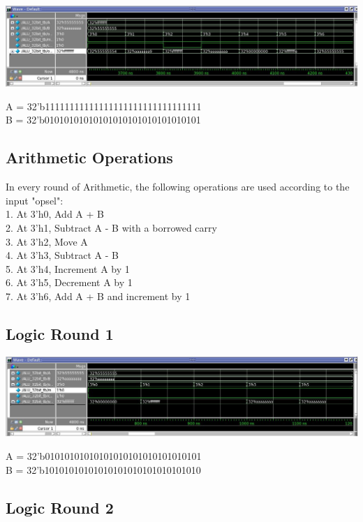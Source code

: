 \documentclass[paper=letter, fontsize=11pt]{scrartcl}
\numberwithin{equation}{section} %
\numberwithin{figure}{section} %
\numberwithin{table}{section} %
\begin{document}
	\centering
			\includegraphics[width=1.0\textwidth]{Art4}
				\label{fig:Art4}
\raggedright A = 32'b11111111111111111111111111111111\\
B = 32'b01010101010101010101010101010101

\subsection{Arithmetic Operations}
\begin{flushleft}
In every round of Arithmetic, the following operations are used according to the input "opsel": \\ [15pt]
1. At 3'h0, Add A + B\\ 
2. At 3'h1, Subtract A - B with a borrowed carry\\
3. At 3'h2, Move A\\
4. At 3'h3, Subtract A - B\\
5. At 3'h4, Increment A by 1\\
6. At 3'h5, Decrement A by 1\\
7. At 3'h6, Add A + B and increment by 1    
\end{flushleft}

\subsection{Logic Round 1}

	\centering
			\includegraphics[width=1.0\textwidth]{Log1}
				\label{fig:Log1} \\[-15pt]
\raggedright A = 32'b01010101010101010101010101010101\\  
B = 32'b10101010101010101010101010101010

\subsection{Logic Round 2}
\end{document}
